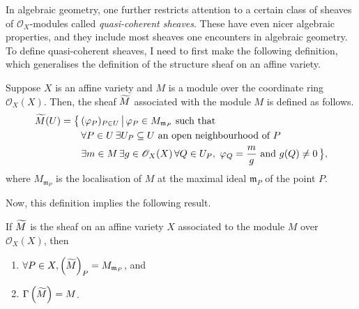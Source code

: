 In algebraic geometry, one further restricts attention to a certain class of
sheaves of $\mathscr{O}_{X}$-modules called \emph{quasi-coherent sheaves}.
These have even nicer algebraic properties, and they include most sheaves
one encounters in algebraic geometry. To define quasi-coherent sheaves,
I need to first make the following definition, which generalises the
definition of the structure sheaf on an affine variety.
\begin{defin}
  Suppose $X$ is an affine variety and $M$ is a module over the coordinate
  ring $\mathscr{O}_{X}(X)$. Then, the sheaf $\widetilde{M}$ associated with the
  module $M$ is defined as follows.
  \begin{align*}
    \widetilde{M}(U)=\big\{\,
    & (\varphi_{P})_{P\in U}\,\big\vert\, \varphi_{P}\in M_{\mathfrak{m}_{P}}
      \text{ such that} \\
    & \forall P\in U\,
      \exists U_{P}\subseteq U\text{ an open neighbourhood of }P \\
    & \exists m\in M\,\exists g\in \mathscr{O}_{X}(X)\,
    \forall Q\in U_{P},\ \varphi_{Q}=\frac{m}g\text{ and } g(Q)\neq 0\,\big\},
  \end{align*}
  where $M_{\mathfrak{m}_{P}}$ is the localisation of $M$ at the maximal ideal
  $\mathfrak{m}_{P}$ of the point $P$.
\end{defin}
Now, this definition implies the following result.
\begin{lemm}\label{lemm:qcoh_local_global}
  If $\widetilde{M}$ is the sheaf on an affine variety $X$ associated to the module
  $M$ over $\mathscr{O}_{X}(X)$, then
  \begin{enumerate}[label=\normalfont(\alph*)]
    \item $\forall P\in X, \left(\widetilde{M}\right)_{P}=M_{\mathfrak{m}_{P}}$, and
    \item $\Gamma\left(\widetilde{M}\right)=M$.
  \end{enumerate}
\end{lemm}
